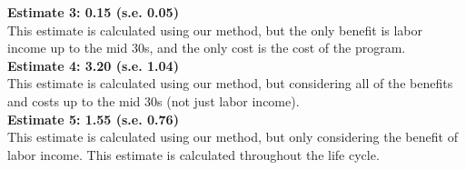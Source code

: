 \noindent \textbf{Estimate 3: 0.15 (s.e. 0.05)} \\

This estimate is calculated using our method, but the only benefit is labor income up to the mid 30s, and the only cost is the cost of the program. \\

\noindent \textbf{Estimate 4: 3.20 (s.e. 1.04)} \\

This estimate is calculated using our method, but considering all of the benefits and costs up to the mid 30s (not just labor income). \\

\noindent \textbf{Estimate 5: 1.55 (s.e. 0.76)} \\ 

This estimate is calculated using our method, but only considering the benefit of labor income. This estimate is calculated throughout the life cycle.